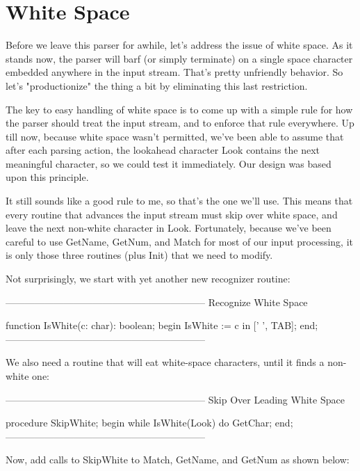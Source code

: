 \documentclass[float=false, crop=false]{standalone}
\begin{document}
\section{White Space}

Before we leave this parser for awhile, let's address the issue of white space.
As it stands now, the parser will barf (or simply terminate) on a single space
character embedded anywhere in the input stream. That's pretty unfriendly
behavior. So let's "productionize" the thing a bit by eliminating this last
restriction.

The key to easy handling of white space is to come up with a simple rule for how
the parser should treat the input stream, and to enforce that rule everywhere.
Up till now, because white space wasn't permitted, we've been able to assume
that after each parsing action, the lookahead character Look contains the next
meaningful character, so we could test it immediately. Our design was based upon
this principle.

It still sounds like a good rule to me, so that's the one we'll use. This means
that every routine that advances the input stream must skip over white space,
and leave the next non-white character in Look. Fortunately, because we've been
careful to use GetName, GetNum, and Match for most of our input processing, it
is only those three routines (plus Init) that we need to modify.

Not surprisingly, we start with yet another new recognizer routine:

\begin{code}
{--------------------------------------------------------------}
{ Recognize White Space }

function IsWhite(c: char): boolean;
begin
   IsWhite := c in [' ', TAB];
end;
{--------------------------------------------------------------}
\end{code}

We also need a routine that will eat white-space characters, until it finds a
non-white one:

\begin{code}
{--------------------------------------------------------------}
{ Skip Over Leading White Space }

procedure SkipWhite;
begin
   while IsWhite(Look) do
      GetChar;
end;
{--------------------------------------------------------------}
\end{code}

Now, add calls to SkipWhite to Match, GetName, and GetNum as shown below:
\end{document}

